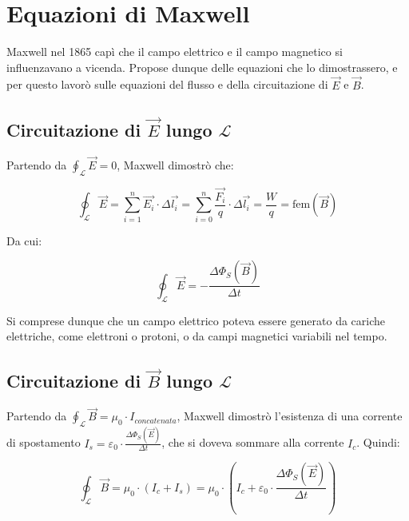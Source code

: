 
\section{Equazioni di Maxwell}

Maxwell nel 1865 capì che il campo elettrico e il campo magnetico si influenzavano a vicenda.
Propose dunque delle equazioni che lo dimostrassero, e per questo lavorò sulle equazioni del flusso e della circuitazione di $\vec{E}$ e $\vec{B}$.

\subsection{Circuitazione di $\vec{E}$ lungo $\mathcal{L}$}

Partendo da $\oint_{\mathcal{L}} \vec{E} = 0$, Maxwell dimostrò che:

\begin{equation*}
    \oint_{\mathcal{L}} \vec{E} = \sum_{i = 1}^{n} \vec{E_i} \cdot \Delta {\vec{l_i}} = \sum_{i = 0}^{n} \frac{\vec{F_i}}{q} \cdot \Delta {\vec{l_i}} = \frac{W}{q} = \text{fem}(\vec{B})
\end{equation*}

Da cui:

\begin{equation*}
    \oint_{\mathcal{L}} \vec{E} = - \frac{\Delta \Phi_S(\vec{B})}{\Delta t}
\end{equation*}

Si comprese dunque che un campo elettrico poteva essere generato da cariche elettriche, come elettroni o protoni, o da campi magnetici variabili nel tempo.

\subsection{Circuitazione di $\vec{B}$ lungo $\mathcal{L}$}

Partendo da $\oint_{\mathcal{L}} \vec{B} = \mu_0 \cdot I_{concatenata}$, Maxwell dimostrò l'esistenza di una corrente di spostamento $I_s = \varepsilon_0 \cdot \frac{\Delta \Phi_S(\vec{E})}{\Delta t}$, che si doveva sommare alla corrente $I_c$.
Quindi:

\begin{equation*}
    \oint_{\mathcal{L}} \vec{B} = \mu_0 \cdot (I_c + I_s) = \mu_0 \cdot \left( I_c + \varepsilon_0 \cdot \frac{\Delta \Phi_S(\vec{E})}{\Delta t} \right)
\end{equation*}

